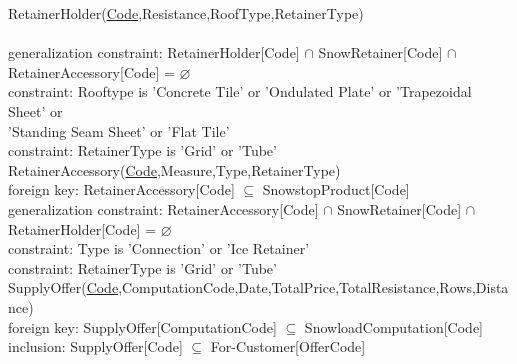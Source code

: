 \documentclass{article}[h]
\begin{document}
{{\color{ForestGreen}RetainerHolder(\underline{Code},Resistance,RoofType,RetainerType)}\\
{ \\
{\color{Orange}\hspace{2mm} generalization constraint: {\color{Magenta} RetainerHolder[Code] $\cap $ SnowRetainer[Code] $\cap$ RetainerAccessory[Code] = $\varnothing $}} \\ 
{\color{Orange}\hspace{2mm} constraint: {\color{Magenta}Rooftype is 'Concrete Tile' or 'Ondulated Plate' or 'Trapezoidal Sheet' or}} \\
{\color{Magenta}\hspace{19.5mm}'Standing Seam Sheet' or 'Flat Tile'}\\
{\color{Orange}\hspace{2mm} constraint: {\color{Magenta}RetainerType is 'Grid' or 'Tube'}} \\

{\color{ForestGreen}RetainerAccessory(\underline{Code},Measure,Type,RetainerType)}\\
{\color{Orange}\hspace{2mm} foreign key: {\color{Magenta}RetainerAccessory[Code] $\subseteq$ SnowstopProduct[Code]}} \\
{\color{Orange}\hspace{2mm} generalization constraint: {\color{Magenta} RetainerAccessory[Code] $\cap $ SnowRetainer[Code] $\cap$ RetainerHolder[Code] = $\varnothing $}} \\ 
{\color{Orange}\hspace{2mm} constraint: {\color{Magenta}Type is 'Connection' or 'Ice Retainer'}} \\ 
{\color{Orange}\hspace{2mm} constraint: {\color{Magenta}RetainerType is 'Grid' or 'Tube'}} \\

{\color{ForestGreen}SupplyOffer(\underline{Code},ComputationCode,Date,TotalPrice,TotalResistance,Rows,Distance)}\\
{\color{Orange}\hspace{2mm} foreign key: {\color{Magenta}SupplyOffer[ComputationCode] $\subseteq$ SnowloadComputation[Code]}} \\
{\color{Orange}\hspace{2mm} inclusion: {\color{Magenta}SupplyOffer[Code] $\subseteq$ For-Customer[OfferCode]}} \\

}}
\end{document}
